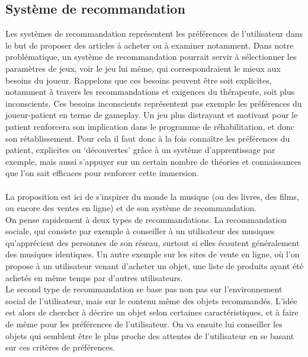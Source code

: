 	\subsection{Système de recommandation}	 \label{recommandation}
Les systèmes de recommandation représentent les préférences de l'utilisateur dans le but de proposer des articles à acheter ou à examiner notamment. Dans notre problématique, un système de recommandation pourrait servir à sélectionner les paramètres de jeux, voir le jeu lui même, qui correspondraient le mieux aux besoins du joueur. Rappelons que ces besoins peuvent être soit explicites, notamment à travers les recommandations et exigences du thérapeute, soit plus inconscients. Ces besoins inconscients représentent pas exemple les préférences du joueur-patient en terme de gameplay. Un jeu plus distrayant et motivant pour le patient renforcera son implication dans le programme de réhabilitation, et donc son rétablissement. Pour cela il faut donc à la fois connaître les préférences du patient, explicites ou `découvertes'  grâce à un système d'apprentissage par exemple, mais aussi s'appuyer sur un certain nombre de théories et connaissances que l'on sait efficaces pour renforcer cette immersion. 	
	 
 \paragraph{}
 La proposition est ici de s'inspirer du monde la musique (ou des livres, des films, ou encore des ventes en ligne) et de son système de recommandation.\\
 On pense rapidement à deux types de recommandations. La recommandation sociale, qui consiste par exemple à conseiller à un utilisateur des musiques qu'apprécient des personnes de son réseau, surtout si elles écoutent généralement des musiques identiques. Un autre exemple sur les sites de vente en ligne, où l'on propose à un utilisateur venant d'acheter un objet, une liste de produits ayant été achetés en même temps par d'autres utilisateurs. \\
Le second type de recommandation se base pas non pas sur l'environnement social de l'utilisateur, mais sur le contenu même des objets recommandés. L'idée est alors de chercher à décrire un objet selon certaines caractéristiques, et à faire de même pour les préférences de l'utilisateur. On va ensuite lui conseiller les objets qui semblent être le plus proche des attentes de l'utilisateur en se basant sur ces critères de préférences. 
 
